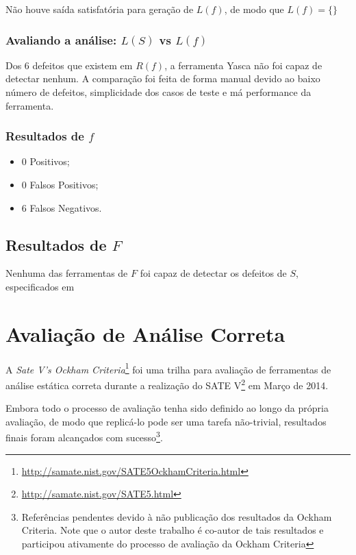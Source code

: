 Não houve saída satisfatória para geração de $L(f)$, de modo que 
$L(f) = \lbrace\rbrace$

\subsubsection{Avaliando a análise: $L(S)$ vs $L(f)$}

Dos 6 defeitos que existem em $R(f)$, a ferramenta Yasca não foi capaz de detectar nenhum. A comparação foi feita de forma manual devido ao baixo número de defeitos, simplicidade dos casos de teste e má performance da ferramenta.

\subsubsection{Resultados de $f$}

\begin{itemize}
  \item 0 Positivos;
  \item 0 Falsos Positivos;
  \item 6 Falsos Negativos.
\end{itemize}

\subsection{Resultados de $F$}

Nenhuma das ferramentas de $F$ foi capaz de detectar os defeitos de $S$, especificados em 

\section{Avaliação de Análise Correta}

A \textit{Sate V's Ockham Criteria}\footnote{\url{http://samate.nist.gov/SATE5OckhamCriteria.html}} foi uma trilha para avaliação de ferramentas de análise estática correta durante a realização do SATE V\footnote{\url{http://samate.nist.gov/SATE5.html}} em Março de 2014.

Embora todo o processo de avaliação tenha sido definido ao longo da própria avaliação, de modo que replicá-lo pode ser uma tarefa não-trivial, resultados finais foram alcançados com sucesso\footnote{Referências pendentes devido à não publicação dos resultados da Ockham Criteria. Note que o autor deste trabalho é co-autor de tais resultados e participou ativamente do processo de avaliação da Ockham Criteria}.

